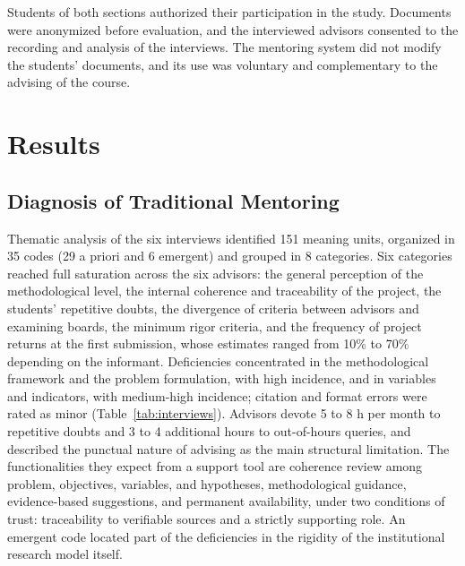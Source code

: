 \documentclass[journal]{IEEEtran}
\begin{document}
Students of both sections authorized their participation in the study. Documents were anonymized before evaluation, and the interviewed advisors consented to the recording and analysis of the interviews. The mentoring system did not modify the students' documents, and its use was voluntary and complementary to the advising of the course.

\section{Results}

\subsection{Diagnosis of Traditional Mentoring}

Thematic analysis of the six interviews identified 151 meaning units, organized in 35 codes (29 a priori and 6 emergent) and grouped in 8 categories. Six categories reached full saturation across the six advisors: the general perception of the methodological level, the internal coherence and traceability of the project, the students' repetitive doubts, the divergence of criteria between advisors and examining boards, the minimum rigor criteria, and the frequency of project returns at the first submission, whose estimates ranged from 10\% to 70\% depending on the informant. Deficiencies concentrated in the methodological framework and the problem formulation, with high incidence, and in variables and indicators, with medium-high incidence; citation and format errors were rated as minor (Table~\ref{tab:interviews}). Advisors devote 5 to 8 h per month to repetitive doubts and 3 to 4 additional hours to out-of-hours queries, and described the punctual nature of advising as the main structural limitation. The functionalities they expect from a support tool are coherence review among problem, objectives, variables, and hypotheses, methodological guidance, evidence-based suggestions, and permanent availability, under two conditions of trust: traceability to verifiable sources and a strictly supporting role. An emergent code located part of the deficiencies in the rigidity of the institutional research model itself.
\end{document}
